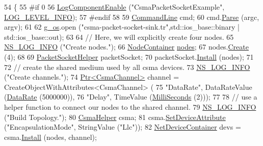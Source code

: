 \begin{DoxyCode}
54 \{
55 \textcolor{preprocessor}{#if 0 }
56   \hyperlink{namespacens3_adc4ef4f00bb2f5f4edae67fc3bc27f20}{LogComponentEnable} (\textcolor{stringliteral}{"CsmaPacketSocketExample"}, 
      \hyperlink{namespacens3_aa6464a4d69551a9cc968e17a65f39bdbae36aedc880de94fd5a5b53bb9fe65628}{LOG\_LEVEL\_INFO});
57 \textcolor{preprocessor}{#endif}
58 
59   \hyperlink{classns3_1_1CommandLine}{CommandLine} cmd;
60   cmd.\hyperlink{classns3_1_1CommandLine_a5c10b85b3207e5ecb48d907966923156}{Parse} (argc, argv);
61 
62   \hyperlink{csma-packet-socket_8cc_a352b10ecde0ce8055a327bd473cc6fbb}{g\_os}.open (\textcolor{stringliteral}{"csma-packet-socket-sink.tr"},std::ios\_base::binary | std::ios\_base::out);
63 
64   \textcolor{comment}{// Here, we will explicitly create four nodes.}
65   \hyperlink{group__logging_gafbd73ee2cf9f26b319f49086d8e860fb}{NS\_LOG\_INFO} (\textcolor{stringliteral}{"Create nodes."});
66   \hyperlink{classns3_1_1NodeContainer}{NodeContainer} \hyperlink{visualizer-ideas_8txt_a3e1b3808014a2c68ab0cd0182e041be2}{nodes};
67   nodes.\hyperlink{classns3_1_1NodeContainer_a787f059e2813e8b951cc6914d11dfe69}{Create} (4);
68 
69   \hyperlink{classns3_1_1PacketSocketHelper}{PacketSocketHelper} packetSocket;
70   packetSocket.\hyperlink{classns3_1_1PacketSocketHelper_a33f449fee7fd10411949d17feba6d33e}{Install} (nodes);
71 
72   \textcolor{comment}{// create the shared medium used by all csma devices.}
73   \hyperlink{group__logging_gafbd73ee2cf9f26b319f49086d8e860fb}{NS\_LOG\_INFO} (\textcolor{stringliteral}{"Create channels."});
74   \hyperlink{classns3_1_1Ptr}{Ptr<CsmaChannel>} channel = CreateObjectWithAttributes<CsmaChannel> (
75       \textcolor{stringliteral}{"DataRate"}, DataRateValue (\hyperlink{classns3_1_1DataRate}{DataRate} (5000000)),
76       \textcolor{stringliteral}{"Delay"}, TimeValue (\hyperlink{group__timecivil_gaf26127cf4571146b83a92ee18679c7a9}{MilliSeconds} (2)));
77 
78   \textcolor{comment}{// use a helper function to connect our nodes to the shared channel.}
79   \hyperlink{group__logging_gafbd73ee2cf9f26b319f49086d8e860fb}{NS\_LOG\_INFO} (\textcolor{stringliteral}{"Build Topology."});
80   \hyperlink{classns3_1_1CsmaHelper}{CsmaHelper} csma;
81   csma.\hyperlink{classns3_1_1CsmaHelper_a741c31b2526e3570cc62c9d7d9667ca9}{SetDeviceAttribute} (\textcolor{stringliteral}{"EncapsulationMode"}, StringValue (\textcolor{stringliteral}{"Llc"}));
82   \hyperlink{classns3_1_1NetDeviceContainer}{NetDeviceContainer} devs = csma.\hyperlink{classns3_1_1CsmaHelper_af79a91372595230b0817200270ab84e7}{Install} (nodes, channel);

\end{DoxyCode}
